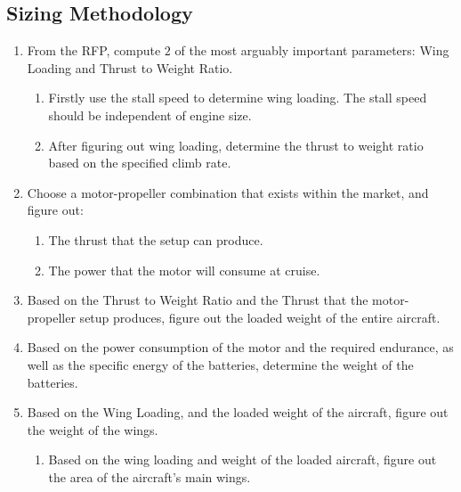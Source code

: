 \documentclass[letter, 12pt]{article}
\begin{document}
\begin{center}
\section{Sizing Methodology}
\begin{comment}
\item Second Alternative Method:
    \begin{enumerate}
    \item Determine the Thrust to Weight Ratio
    \item Determine the wing loading by direct computation 
    \end{enumerate}
\end{comment}
\begin{enumerate}
\item From the RFP, compute $2$ of the most arguably important parameters: Wing Loading and Thrust to Weight Ratio.
    \begin{enumerate}
    \item Firstly use the stall speed to determine wing loading. The stall speed should be independent of engine size.
    \item After figuring out wing loading, determine the thrust to weight ratio based on the specified climb rate.
    \end{enumerate}
\item Choose a motor-propeller combination that exists within the market, and figure out:
    \begin{enumerate}
    \item The thrust that the setup can produce.
    \item The power that the motor will consume at cruise.
    \end{enumerate}
\item Based on the Thrust to Weight Ratio and the Thrust that the motor-propeller setup produces, figure out the loaded weight of the entire aircraft.
\item Based on the power consumption of the motor and the required endurance, as well as the specific energy of the batteries, determine the weight of the batteries.
\item Based on the Wing Loading, and the loaded weight of the aircraft, figure out the weight of the wings.
    \begin{enumerate}
    \item Based on the wing loading and weight of the loaded aircraft, figure out the area of the aircraft's main wings.

\end{enumerate}
\end{enumerate}
\end{center}
\end{document}
